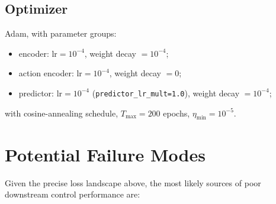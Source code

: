 \documentclass[11pt]{article}
\begin{document}
\subsection{Optimizer}

Adam, with parameter groups:
\begin{itemize}[leftmargin=2em]
  \item encoder: $\text{lr} = 10^{-4}$, weight decay $= 10^{-4}$;
  \item action encoder: $\text{lr} = 10^{-4}$, weight decay $= 0$;
  \item predictor: $\text{lr} = 10^{-4}$ (\texttt{predictor\_lr\_mult=1.0}), weight decay $= 10^{-4}$;
\end{itemize}
with cosine-annealing schedule, $T_{\max} = 200$ epochs, $\eta_{\min} = 10^{-5}$.

\section{Potential Failure Modes}

Given the precise loss landscape above, the most likely sources of poor
downstream control performance are:
\end{document}
